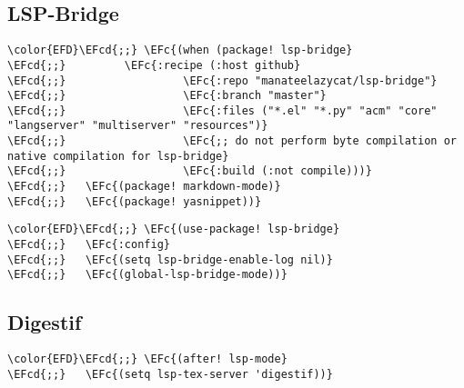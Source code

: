 \documentclass[12pt]{article}
\theoremstyle{plain}%
\theoremstyle{definition}
\theoremstyle{remark}
\newcommand{\EFc}[1]{\textcolor{EFc}{#1}} %
\newcommand{\EFcd}[1]{\textcolor{EFcd}{#1}} %
\begin{document}
\subsection{LSP-Bridge}
\label{sec:org52c4a1c}
\begin{Code}
\begin{Verbatim}
\color{EFD}\EFcd{;;} \EFc{(when (package! lsp-bridge}
\EFcd{;;}         \EFc{:recipe (:host github}
\EFcd{;;}                  \EFc{:repo "manateelazycat/lsp-bridge"}
\EFcd{;;}                  \EFc{:branch "master"}
\EFcd{;;}                  \EFc{:files ("*.el" "*.py" "acm" "core" "langserver" "multiserver" "resources")}
\EFcd{;;}                  \EFc{;; do not perform byte compilation or native compilation for lsp-bridge}
\EFcd{;;}                  \EFc{:build (:not compile)))}
\EFcd{;;}   \EFc{(package! markdown-mode)}
\EFcd{;;}   \EFc{(package! yasnippet))}
\end{Verbatim}
\end{Code}
\begin{Code}
\begin{Verbatim}
\color{EFD}\EFcd{;;} \EFc{(use-package! lsp-bridge}
\EFcd{;;}   \EFc{:config}
\EFcd{;;}   \EFc{(setq lsp-bridge-enable-log nil)}
\EFcd{;;}   \EFc{(global-lsp-bridge-mode))}
\end{Verbatim}
\end{Code}
\subsection{Digestif}
\label{sec:org8f705c2}
\begin{Code}
\begin{Verbatim}
\color{EFD}\EFcd{;;} \EFc{(after! lsp-mode}
\EFcd{;;}   \EFc{(setq lsp-tex-server 'digestif))}
\end{Verbatim}
\end{Code}
\end{document}
